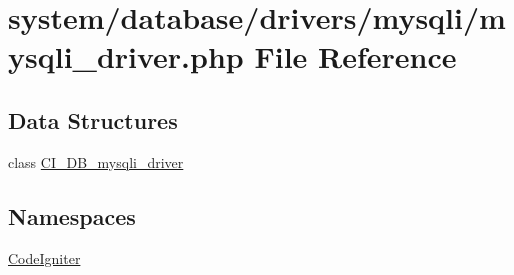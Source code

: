 \hypertarget{mysqli__driver_8php}{}\section{system/database/drivers/mysqli/mysqli\+\_\+driver.php File Reference}
\label{mysqli__driver_8php}
\subsection*{Data Structures}
\begin{DoxyCompactItemize}
\item 
class \mbox{\hyperlink{class_c_i___d_b__mysqli__driver}{C\+I\+\_\+\+D\+B\+\_\+mysqli\+\_\+driver}}
\end{DoxyCompactItemize}
\subsection*{Namespaces}
\begin{DoxyCompactItemize}
\item 
 \mbox{\hyperlink{namespace_code_igniter}{Code\+Igniter}}
\end{DoxyCompactItemize}
